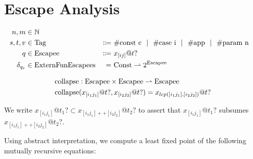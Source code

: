 \section{Escape Analysis}
\begin{alignat*}{3}
  n, m &\in \mathbb{N} \\
  s, t, v &\in \mathrm{Tag} &\Coloneqq&\ \#\textrm{const c} \ \ |\ \  \#\textrm{case i} \ \ |\ \  \#\textrm{app} \ \ |\ \  \#\textrm{param n} \\
  q &\in \mathrm{Escapee}\ &\Coloneqq&\ x_{[ij]} @ t? \\
  \delta_{q_e} &\in \mathrm{ExternFunEscapees} &=&\ \mathrm{Const} \rightharpoonup 2^{\mathrm{Escapee}}
\end{alignat*}

\newcommand{\collapse}{\mathrm{collapse}}

\begin{align*}
  \collapse &: \Escapee \times \Escapee \rightharpoonup \Escapee \\
  \collapse&(x_{[i_1j_1]} @ t?, x_{[i_2j_2]} @ t?) = x_{lcp([i_1j_1], [i_2j_2])} @ t?
\end{align*}

We write
$x_{[i_1j_1]} @ t_1? \subset x_{[i_1j_1]++[i_2j_2]} @ t_2?$ to assert that $x_{[i_1j_1]} @ t_1?$ subsumes $x_{[i_1j_1]++[i_2j_2]} @ t_2?$.

Using abstract interpretation, we compute a least fixed point of the following mutually recursive equations:

\newcommand{\ecp}[2]{\llbracket {#1} \rrbracket_Q \left( {#2} \right)}
\newcommand{\dom}{\mathrm{dom}}

